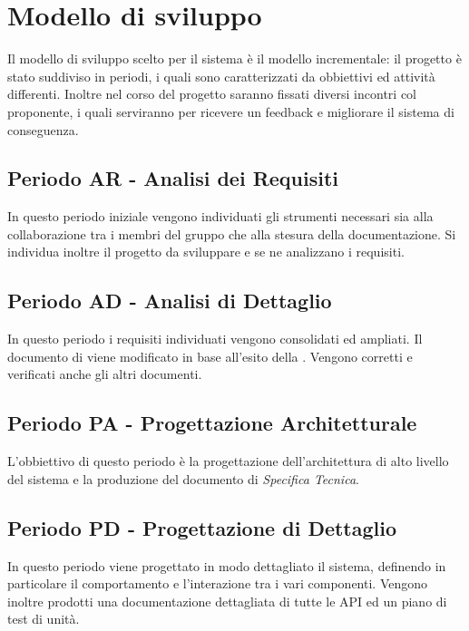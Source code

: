 \documentclass[./PianoDiProgetto.tex]{subfiles}
\begin{document}
  \section{Modello di sviluppo}

  Il modello di sviluppo scelto per il sistema è il modello incrementale: il
  progetto è stato suddiviso in periodi, i quali sono caratterizzati da
  obbiettivi ed attività differenti. Inoltre nel corso del progetto saranno
  fissati diversi incontri col proponente, i quali serviranno per ricevere un
  feedback e migliorare il sistema di conseguenza.

  \subsection{Periodo AR - Analisi dei Requisiti}

  In questo periodo iniziale vengono individuati gli strumenti necessari sia alla
  collaborazione tra i membri del gruppo che alla stesura della documentazione.
  Si individua inoltre il progetto da sviluppare e se ne analizzano i requisiti.

  \subsection{Periodo AD - Analisi di Dettaglio}

  In questo periodo i requisiti individuati vengono consolidati ed ampliati. Il
  documento di \ARdoc viene modificato in base all'esito
  della \RR. Vengono corretti e verificati anche gli altri documenti.

  \subsection{Periodo PA - Progettazione Architetturale}

  L'obbiettivo di questo periodo è la progettazione dell'architettura di alto
  livello del sistema e la produzione del documento di \textit{Specifica Tecnica}.

  \subsection{Periodo PD - Progettazione di Dettaglio}

  In questo periodo viene progettato in modo dettagliato il sistema, definendo
  in particolare il comportamento e l'interazione tra i vari componenti. Vengono
  inoltre prodotti una documentazione dettagliata di tutte le API ed un piano
  di test di unità.
\end{document}
